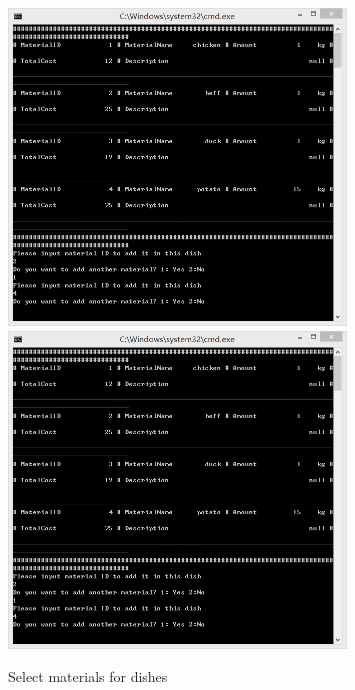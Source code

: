 \documentclass{article}
\begin{document}
\begin{enumerate}
        \begin{figure}[H]
        \centering
        \includegraphics[width=0.8\textwidth]{D/D222221.png}
        \includegraphics[width=0.8\textwidth]{D/D222221.png}
        \caption{Select materials for dishes}
        \end{figure}
    

\end{enumerate}
\end{document}
